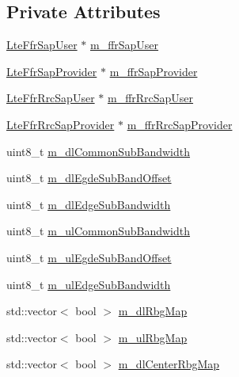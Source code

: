 \subsection*{Private Attributes}
\begin{DoxyCompactItemize}
\item 
\hyperlink{classns3_1_1LteFfrSapUser}{Lte\+Ffr\+Sap\+User} $\ast$ \hyperlink{classns3_1_1LteFfrSoftAlgorithm_a83aae1ddbdc8a4927c4edd4eef2b7304}{m\+\_\+ffr\+Sap\+User}
\item 
\hyperlink{classns3_1_1LteFfrSapProvider}{Lte\+Ffr\+Sap\+Provider} $\ast$ \hyperlink{classns3_1_1LteFfrSoftAlgorithm_a1d8ef4d5fdae2fe96bbcef5327998813}{m\+\_\+ffr\+Sap\+Provider}
\item 
\hyperlink{classns3_1_1LteFfrRrcSapUser}{Lte\+Ffr\+Rrc\+Sap\+User} $\ast$ \hyperlink{classns3_1_1LteFfrSoftAlgorithm_ac8d53e4b096f6e827f23211d06b3793d}{m\+\_\+ffr\+Rrc\+Sap\+User}
\item 
\hyperlink{classns3_1_1LteFfrRrcSapProvider}{Lte\+Ffr\+Rrc\+Sap\+Provider} $\ast$ \hyperlink{classns3_1_1LteFfrSoftAlgorithm_ac899c4a1c04711478697d13e1dd8c349}{m\+\_\+ffr\+Rrc\+Sap\+Provider}
\item 
uint8\+\_\+t \hyperlink{classns3_1_1LteFfrSoftAlgorithm_acf36db070125788cad30dd1e9792889a}{m\+\_\+dl\+Common\+Sub\+Bandwidth}
\item 
uint8\+\_\+t \hyperlink{classns3_1_1LteFfrSoftAlgorithm_a2a697b9fee8b57c2bacba70a93828d8a}{m\+\_\+dl\+Egde\+Sub\+Band\+Offset}
\item 
uint8\+\_\+t \hyperlink{classns3_1_1LteFfrSoftAlgorithm_a756e59fc05e600fc8ce13a0b7f7adeff}{m\+\_\+dl\+Edge\+Sub\+Bandwidth}
\item 
uint8\+\_\+t \hyperlink{classns3_1_1LteFfrSoftAlgorithm_aa396d091845aaef619bec9b68b27ad30}{m\+\_\+ul\+Common\+Sub\+Bandwidth}
\item 
uint8\+\_\+t \hyperlink{classns3_1_1LteFfrSoftAlgorithm_a2070e526e28547d0a048ed13d75a91f1}{m\+\_\+ul\+Egde\+Sub\+Band\+Offset}
\item 
uint8\+\_\+t \hyperlink{classns3_1_1LteFfrSoftAlgorithm_a234348307fd58d2686342a7114899216}{m\+\_\+ul\+Edge\+Sub\+Bandwidth}
\item 
std\+::vector$<$ bool $>$ \hyperlink{classns3_1_1LteFfrSoftAlgorithm_a0a4f9bf93ef2efb75109a1a4c1b3034f}{m\+\_\+dl\+Rbg\+Map}
\item 
std\+::vector$<$ bool $>$ \hyperlink{classns3_1_1LteFfrSoftAlgorithm_a26b7bacc26f0b5b41d313fa501fdce87}{m\+\_\+ul\+Rbg\+Map}
\item 
std\+::vector$<$ bool $>$ \hyperlink{classns3_1_1LteFfrSoftAlgorithm_a6800ea21be07c9f6bbacf0bab7b42b2e}{m\+\_\+dl\+Center\+Rbg\+Map}

\end{DoxyCompactItemize}
